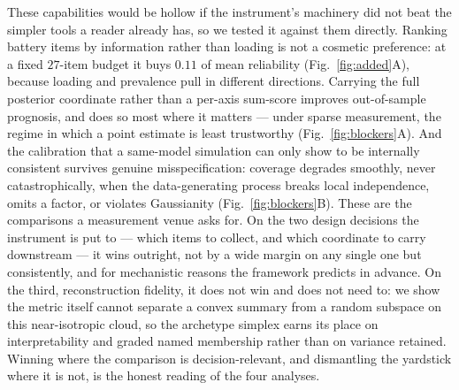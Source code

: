 These capabilities would be hollow if the instrument's machinery did not beat the
simpler tools a reader already has, so we tested it against them directly. Ranking
battery items by information rather than loading is not a cosmetic preference: at a
fixed $27$-item budget it buys $0.11$ of mean reliability
(Fig.~\ref{fig:added}A), because loading and prevalence pull in different
directions. Carrying the full posterior coordinate rather than a per-axis sum-score
improves out-of-sample prognosis, and does so most where it matters ---
under sparse measurement, the regime in which a point estimate is least trustworthy
(Fig.~\ref{fig:blockers}A). And the calibration that a same-model simulation can only
show to be internally consistent survives genuine misspecification: coverage degrades
smoothly, never catastrophically, when the data-generating process breaks local
independence, omits a factor, or violates Gaussianity
(Fig.~\ref{fig:blockers}B). These are the comparisons a measurement venue asks for. On the two design
decisions the instrument is put to --- which items to collect, and which coordinate
to carry downstream --- it wins outright, not by a wide margin on any single one but
consistently, and for mechanistic reasons the framework predicts in advance. On the
third, reconstruction fidelity, it does not win and does not need to: we show the
metric itself cannot separate a convex summary from a random subspace on this
near-isotropic cloud, so the archetype simplex earns its place on interpretability
and graded named membership rather than on variance retained. Winning where the
comparison is decision-relevant, and dismantling the yardstick where it is not, is
the honest reading of the four analyses.

